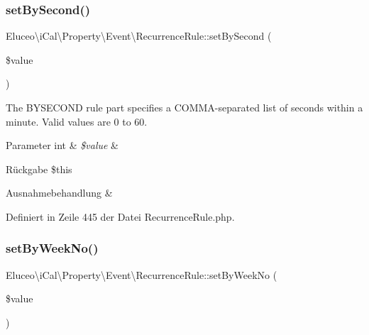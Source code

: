 \subsubsection{\texorpdfstring{set\+By\+Second()}{setBySecond()}\hspace{0.1cm}{\footnotesize\ttfamily [3/3]}}
{\footnotesize\ttfamily Eluceo\textbackslash{}i\+Cal\textbackslash{}\+Property\textbackslash{}\+Event\textbackslash{}\+Recurrence\+Rule\+::set\+By\+Second (\begin{DoxyParamCaption}\item[{}]{\$value }\end{DoxyParamCaption})}

The B\+Y\+S\+E\+C\+O\+ND rule part specifies a C\+O\+M\+M\+A-\/separated list of seconds within a minute. Valid values are 0 to 60.


\begin{DoxyParams}[1]{Parameter}
int & {\em \$value} & \\
\hline
\end{DoxyParams}
\begin{DoxyReturn}{Rückgabe}
\$this
\end{DoxyReturn}

\begin{DoxyExceptions}{Ausnahmebehandlung}
{\em } & \\
\hline
\end{DoxyExceptions}


Definiert in Zeile 445 der Datei Recurrence\+Rule.\+php.

\mbox{\label{class_eluceo_1_1i_cal_1_1_property_1_1_event_1_1_recurrence_rule_a94c0f6b5f543a395e5edb45d2acf77c5}} 
\subsubsection{\texorpdfstring{set\+By\+Week\+No()}{setByWeekNo()}\hspace{0.1cm}{\footnotesize\ttfamily [1/3]}}
{\footnotesize\ttfamily Eluceo\textbackslash{}i\+Cal\textbackslash{}\+Property\textbackslash{}\+Event\textbackslash{}\+Recurrence\+Rule\+::set\+By\+Week\+No (\begin{DoxyParamCaption}\item[{}]{\$value }\end{DoxyParamCaption})}

